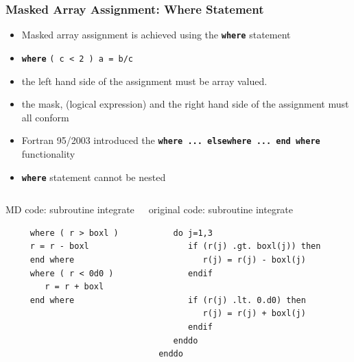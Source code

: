 \documentclass[slidestop,mathserif,compress,xcolor=svgnames]{beamer}
\newenvironment{eblock}[0]
{
\begin{beamerboxesrounded}[upper=uppercol2,lower=lowercol2,shadow=true]}
{\end{beamerboxesrounded}}
\begin{document}
\begin{frame}[fragile]
  \frametitle{\small Masked Array Assignment: Where Statement}
  \begin{block}{}
    \begin{itemize}
      \item Masked array assignment is achieved using the \textbf{\texttt{where}} statement
      \item[] \textbf{\texttt{where}} \texttt{( c < 2 ) a = b/c }
      \item[] the left hand side of the assignment must be array valued.
      \item[] the mask, (logical expression) and the right hand side of the assignment must all conform
      \item Fortran 95/2003 introduced the \textbf{\texttt{where ... elsewhere ... end where}} functionality
      \item \textbf{\texttt{where}} statement cannot be nested
    \end{itemize}
  \end{block}
  {\tiny
    \begin{columns}
      \column{5cm}
      \begin{eblock}{MD code: subroutine integrate}
        \begin{verbatim}
     where ( r > boxl ) 
     r = r - boxl
     end where
     where ( r < 0d0 )
        r = r + boxl
     end where
        \end{verbatim}
      \end{eblock}
      \column{5cm}
      \begin{eblock}{original code: subroutine integrate}
        \begin{verbatim}
     do j=1,3
        if (r(j) .gt. boxl(j)) then
           r(j) = r(j) - boxl(j)
        endif
        
        if (r(j) .lt. 0.d0) then
           r(j) = r(j) + boxl(j)
        endif
     enddo
  enddo
        \end{verbatim}
      \end{eblock}
    \end{columns}
  }
\end{frame}
\end{document}
